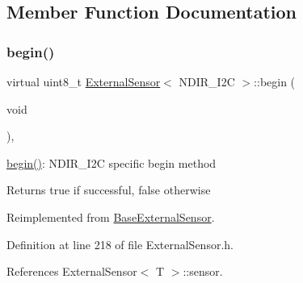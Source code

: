 \subsection{Member Function Documentation}
\mbox{\label{classExternalSensor_3_01NDIR__I2C_01_4_ac6f3614d94968ef0cc11b2b4d69cef03}} 
\subsubsection{\texorpdfstring{begin()}{begin()}}
{\footnotesize\ttfamily virtual uint8\+\_\+t \hyperlink{classExternalSensor}{External\+Sensor}$<$ N\+D\+I\+R\+\_\+\+I2C $>$\+::begin (\begin{DoxyParamCaption}\item[{void}]{ }\end{DoxyParamCaption})\hspace{0.3cm}{\ttfamily [inline]}, {\ttfamily [virtual]}}

\hyperlink{classExternalSensor_3_01NDIR__I2C_01_4_ac6f3614d94968ef0cc11b2b4d69cef03}{begin()}\+: N\+D\+I\+R\+\_\+\+I2C specific begin method

\begin{DoxyReturn}{Returns}
true if successful, false otherwise 
\end{DoxyReturn}


Reimplemented from \hyperlink{classBaseExternalSensor_a87d132803d4f4fdd4e66332809f0c9a0}{Base\+External\+Sensor}.



Definition at line 218 of file External\+Sensor.\+h.



References External\+Sensor$<$ T $>$\+::sensor.


